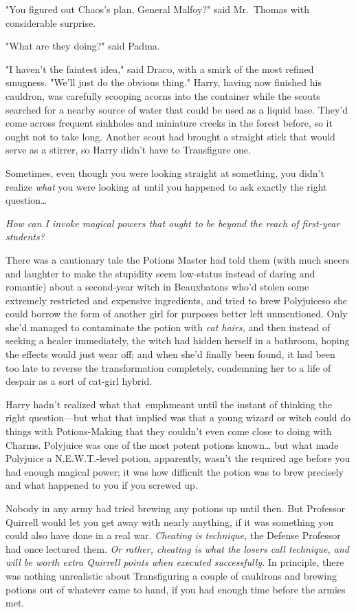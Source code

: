 "You figured out Chaos's plan, General Malfoy?" said Mr.~Thomas with 
considerable surprise.

"What are they doing?" said Padma.

"I haven't the faintest idea," said Draco, with a smirk of the most refined 
smugness. "We'll just do the obvious thing."
\sbreak
Harry, having now finished his cauldron, was carefully scooping acorns into the 
container while the scouts searched for a nearby source of water that could be 
used as a liquid base. They'd come across frequent sinkholes and miniature 
creeks in the forest before, so it ought not to take long. Another scout had 
brought a straight stick that would serve as a stirrer, so Harry didn't have to 
Transfigure one.

Sometimes, even though you were looking straight at something, you didn't 
realize \emph{what} you were looking at until you happened to ask exactly the 
right question{\ldots}

\emph{How can I invoke magical powers that ought to be beyond the reach of 
first-year students?}

There was a cautionary tale the Potions Master had told them (with much sneers 
and laughter to make the stupidity seem low-status instead of daring and 
romantic) about a second-year witch in Beauxbatons who'd stolen some extremely 
restricted and expensive ingredients, and tried to brew Polyjuiceso she could 
borrow the form of another girl for purposes better left unmentioned. Only 
she'd managed to contaminate the potion with \emph{cat hairs,} and then instead 
of seeking a healer immediately, the witch had hidden herself in a bathroom, 
hoping the effects would just wear off; and when she'd finally been found, it 
had been too late to reverse the transformation completely, condemning her to a 
life of despair as a sort of cat-girl hybrid.

Harry hadn't realized what that\ emph{meant} until the instant of thinking the 
right question---but what that implied was that a young wizard or witch could 
do things with Potions-Making that they couldn't even come close to doing with 
Charms. Polyjuice was one of the most potent potions known{\ldots} but what 
made Polyjuice a N.E.W.T.-level potion, apparently, wasn't the required age 
before you had enough magical power; it was how difficult the potion was to 
brew precisely and what happened to you if you screwed up.

Nobody in any army had tried brewing any potions up until then. But Professor 
Quirrell would let you get away with nearly anything, if it was something you 
could also have done in a real war. \emph{Cheating is technique,} the Defense 
Professor had once lectured them. \emph{Or rather, cheating is what the losers 
call technique, and will be worth extra Quirrell points when executed 
successfully.} In principle, there was nothing unrealistic about Transfiguring 
a couple of cauldrons and brewing potions out of whatever came to hand, if you 
had enough time before the armies met.

